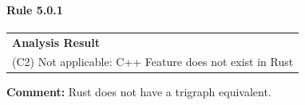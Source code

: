\paragraph{Rule 5.0.1}
\begin{longtable}{p{13cm}}
\textbf{Analysis Result} \\
(C2) Not applicable: C++ Feature does not exist in Rust \\
\end{longtable}
\textbf{Comment:} Rust does not have a trigraph equivalent. \\
